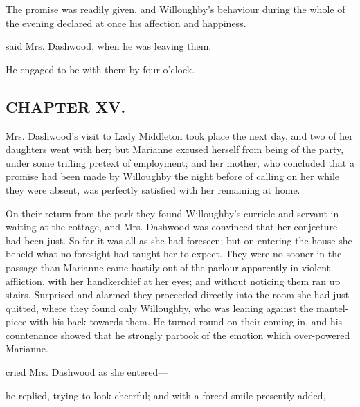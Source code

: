 The promise was readily given, and Willoughby's behaviour during the whole of the evening declared at once his affection and happiness.

 said Mrs. Dashwood, when he was leaving them. 

He engaged to be with them by four o'clock.

\subsection[chapter-xv.]{\useURL[url15][][][]\from[url15]CHAPTER XV.}

Mrs. Dashwood's visit to Lady Middleton took place the next day, and two of her daughters went with her; but Marianne excused herself from being of the party, under some trifling pretext of employment; and her mother, who concluded that a promise had been made by Willoughby the night before of calling on her while they were absent, was perfectly satisfied with her remaining at home.

On their return from the park they found Willoughby's curricle and servant in waiting at the cottage, and Mrs. Dashwood was convinced that her conjecture had been just. So far it was all as she had foreseen; but on entering the house she beheld what no foresight had taught her to expect. They were no sooner in the passage than Marianne came hastily out of the parlour apparently in violent affliction, with her handkerchief at her eyes; and without noticing them ran up stairs. Surprised and alarmed they proceeded directly into the room she had just quitted, where they found only Willoughby, who was leaning against the mantel-piece with his back towards them. He turned round on their coming in, and his countenance showed that he strongly partook of the emotion which over-powered Marianne.

 cried Mrs. Dashwood as she entered---

 he replied, trying to look cheerful; and with a forced smile presently added, 



